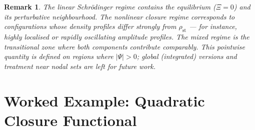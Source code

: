 \documentclass[12pt]{article}
\newtheorem{remark}[theorem]{Remark}
\begin{document}
\begin{remark}
The linear Schr\"odinger regime contains the equilibrium ($\Xi = 0$) and its perturbative neighbourhood. The nonlinear closure regime corresponds to configurations whose density profiles differ strongly from $\rho_{\mathrm{st}}$ --- for instance, highly localised or rapidly oscillating amplitude profiles. The mixed regime is the transitional zone where both components contribute comparably. This pointwise quantity is defined on regions where $|\Psi| > 0$; global (integrated) versions and treatment near nodal sets are left for future work.
\end{remark}

\section{Worked Example: Quadratic Closure Functional}\label{sec:example}
\end{document}
